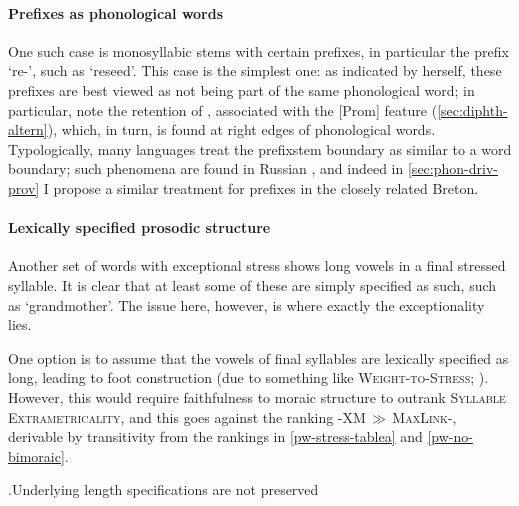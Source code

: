 \paragraph{Prefixes as phonological words}
\label{sec:pref-as-phon}

One such case is monosyllabic stems with certain prefixes, in particular the prefix \ipa{[ail]} `re-', such as \ipa{[ailˈhoi]} `reseed'. This case is the simplest one: as indicated by \citet[p.~154]{awbery86:_pembr_welsh} herself, these prefixes are best viewed as not being part of the same phonological word; in particular, note the retention of \ipa{[ai]}, associated with the [Prom] feature (\cref{sec:diphth-altern}), which, in turn, is found at right edges of phonological words. Typologically, many languages treat the prefix\endash stem boundary as similar to a word boundary; such phenomena are found in Russian \citep{rubach2000,gribanova08:_russian_strat_ot,gribanova09:_phonol_russian}, and indeed in \cref{sec:phon-driv-prov} I propose a similar treatment for prefixes in the closely related Breton.

\paragraph{Lexically specified prosodic structure}
\label{sec:lexic-spec-pros}

Another set of words with exceptional stress shows long vowels in a final stressed syllable. It is clear that at least some of these are simply specified as such, such as \ipa{[maŋˈɡiː]} `grandmother'. The issue here, however, is where exactly the exceptionality lies.

One option is to assume that the vowels of final syllables are lexically specified as long, leading to foot construction (due to something like \textsc{Weight-to-Stress}; \eg \citealt{prince92:_quant,ot}). However, this would require faithfulness to moraic structure to outrank \textsc{Syllable Extrametricality}, and this goes against the ranking \sy-\textsc{XM}\,$\gg$\,\textsc{MaxLink}-\mo[V], derivable by transitivity from the rankings in \ref{pw-stress-tablea} and \ref{pw-no-bimoraic}.

\ex.Underlying length specifications are not preserved\\
\begin{OTtableau}{3}
\end{OTtableau}

